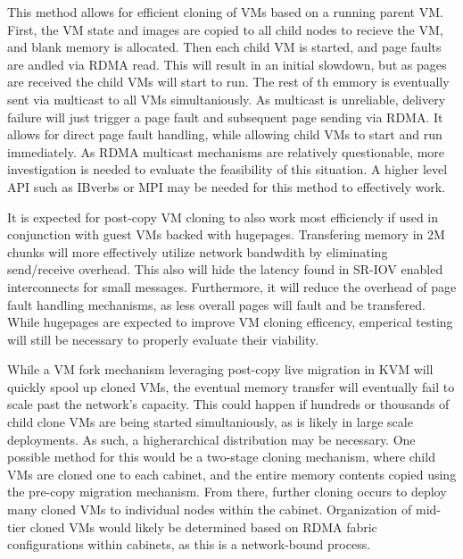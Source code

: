 This method allows for efficient cloning of VMs based on a running parent VM. First, the VM state and images are copied to all child nodes to recieve the VM, and blank memory is allocated. Then each child VM is started, and page faults are andled via RDMA read. This will result in an initial slowdown, but as pages are received the child VMs will start to run. The rest of th emmory is eventually sent via multicast to all VMs simultaniously.   As multicast is unreliable, delivery failure will just trigger a page fault and subsequent page sending via RDMA.  It allows for direct page fault handling, while allowing child VMs to start and run immediately. As RDMA multicast mechanisms are relatively questionable,  more investigation is needed to evaluate the feasibility of this situation. A higher level API such as IBverbs or MPI may be needed for this method to effectively work.  

It is expected for post-copy VM cloning to also work most efficiencly if used in conjunction with guest VMs backed with hugepages. Transfering memory in 2M chunks will more effectively utilize network bandwdith by eliminating send/receive overhead. This also will hide the latency found in SR-IOV enabled interconnects for small messages. Furthermore, it will reduce the overhead of page fault handling mechanisms, as less overall pages will fault and be transfered.  While hugepages are expected to improve VM cloning efficency, emperical testing will still be necessary to properly evaluate their viability.   

While a VM fork mechanism leveraging post-copy live migration in KVM will quickly spool up cloned VMs, the eventual memory transfer will eventually fail to scale past the network's capacity. This could happen if hundreds or thousands of child clone VMs are being started simultaniously, as is likely in large scale deployments. As such, a higherarchical distribution may be necessary. One possible method for this would be a two-stage cloning mechanism, where child VMs are cloned one to each cabinet, and the entire memory contents copied using the pre-copy migration mechanism. From there, further cloning occurs to deploy many cloned VMs to individual nodes within the cabinet. Organization of mid-tier cloned VMs would likely be determined based on RDMA fabric configurations within cabinets, as this is a network-bound process. 


